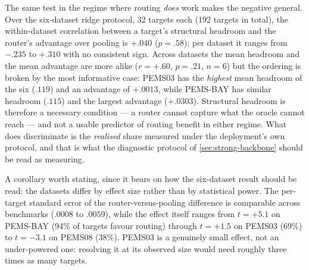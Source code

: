The same test in the regime where routing \emph{does} work makes the
negative general. Over the six-dataset ridge protocol, 32 targets each
(192 targets in total), the within-dataset correlation between a target's
structural headroom and the router's advantage over pooling is $+.040$
($p=.58$); per dataset it ranges from $-.235$ to $+.310$ with no consistent
sign. Across datasets the mean headroom and the mean advantage are more alike
($r=+.60$, $p=.21$, $n=6$) but the ordering is broken by the most informative
case: PEMS03 has the \emph{highest} mean headroom of the six ($.119$) and an
advantage of $+.0013$, while PEMS-BAY has similar headroom ($.115$) and the
largest advantage ($+.0303$). Structural headroom is therefore a necessary
condition --- a router cannot capture what the oracle cannot reach --- and not
a usable predictor of routing benefit in either regime. What does discriminate
is the \emph{realised} share measured under the deployment's own protocol, and
that is what the diagnostic protocol of \cref{sec:strong-backbone} should be read
as measuring.

A corollary worth stating, since it bears on how the six-dataset result should
be read: the datasets differ by effect size rather than by statistical power.
The per-target standard error of the router-versus-pooling difference is
comparable across benchmarks ($.0008$ to $.0059$), while the effect itself
ranges from $t=+5.1$ on PEMS-BAY (94\% of targets favour routing) through
$t=+1.5$ on PEMS03 (69\%) to $t=-3.1$ on PEMS08 (38\%). PEMS03 is a genuinely
small effect, not an under-powered one: resolving it at its observed size would
need roughly three times as many targets.

